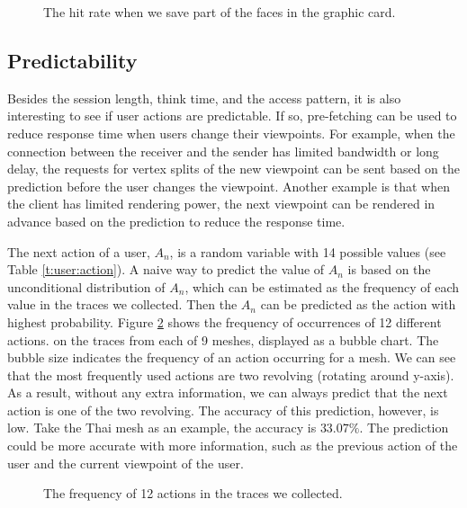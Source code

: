 \begin{figure}[htdp!]
    \centering
\caption{The hit rate when we save part of the faces in the graphic card.\label{fig:face_hit_rate}}
\end{figure}

\subsection{Predictability}
\label{ss:user:predictability}
Besides the session length, think time, and the access pattern,
it is also interesting to see if user actions are predictable. 
If so, pre-fetching can be used to reduce response time when
users change their viewpoints. For example, when the connection between the 
receiver and the sender has limited bandwidth
or long delay, the requests for vertex splits of the new viewpoint 
can be sent based on the prediction before the user changes the viewpoint.
Another example is that when the client has limited
rendering power, the next viewpoint can be rendered
in advance based on the prediction to reduce the response time. 

The next action of a user, $A_n$, is a random variable with 14 possible values
(see Table \ref{t:user:action}). 
A naive way to predict the value of $A_n$ is based on the unconditional distribution 
of $A_n$, which can be estimated as the frequency of each value in the traces
we collected.  
Then the $A_n$ can be predicted as the action with highest probability.
Figure \ref{f:user:frequency}
shows the frequency of occurrences of 12 different actions.
on the traces from each of 9 meshes,
displayed as a bubble chart. 
The bubble size indicates the frequency of an action occurring for a mesh.
We can see that the most frequently used actions are two revolving (rotating around y-axis). 
As a result, without any extra information, we can always predict that the next action is 
one of the two revolving.
The accuracy of this prediction, however, is low. 
Take the Thai mesh as an example,
the accuracy is $33.07\%$. %
The prediction could be more accurate with more information,
such as the previous action of the user and the current viewpoint of the user.
\begin{figure}[htdp!]
    \centering
    \caption{The frequency of 12 actions in the traces we collected.}
    \label{f:user:frequency}
\end{figure}


